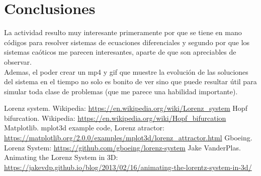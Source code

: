 \documentclass[12pt,letterpaper]{article}
\begin{document}
\section{Conclusiones} 

La actividad resulto muy interesante primeramente por que se tiene en mano códigos para resolver sistemas de ecuaciones diferenciales y segundo por que los sistemas caóticos me parecen interesantes, aparte de que son apreciables de observar.\\
Ademas, el poder crear un mp4 y gif que muestre la evolución de las soluciones del sistema en el tiempo no solo es bonito de ver sino que puede resultar útil para simular toda clase de problemas (que me parece una habilidad importante).

\begin{thebibliography}{2}

 Lorenz system. Wikipedia: \url{https://en.wikipedia.org/wiki/Lorenz_system}
 Hopf bifurcation. Wikipedia: \url{https://en.wikipedia.org/wiki/Hopf_bifurcation}
 Matplotlib. mplot3d example code, Lorenz atractor: \url{https://matplotlib.org/2.0.0/examples/mplot3d/lorenz_attractor.html}
  Gboeing. Lorenz System: \url{https://github.com/gboeing/lorenz-system} 
 Jake VanderPlas. Animating the Lorenz System in 3D: \url{https://jakevdp.github.io/blog/2013/02/16/animating-the-lorentz-system-in-3d/}

\end{thebibliography}
\end{document}
